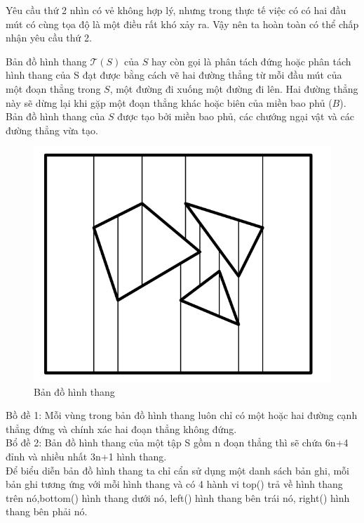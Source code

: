 \documentclass[a4paper,12pt]{report}
\begin{document}
Yêu cầu thứ 2 nhìn có vẻ không hợp lý, nhưng trong thực tế việc có có hai đầu mút có cùng tọa độ là một điều rất khó xảy ra. Vậy nên ta hoàn toàn có thể chấp nhận yêu cầu thứ 2.

Bản đồ hình thang $\mathcal{T}(S)$ của $S$ hay còn gọi là  phân tách đứng hoặc phân tách hình thang của S đạt được bằng cách vẽ hai đường thẳng từ mỗi đầu mút của một đoạn thẳng trong $S$, một đường đi xuống một đường đi lên. Hai đường thẳng này sẽ dừng lại khi gặp một đoạn thẳng khác hoặc biên của miền bao phủ ($B$). Bản đồ hình thang của $S$ được tạo bởi miền bao phủ, các chướng ngại vật và các đường thẳng vừa tạo. \\
\begin{figure}[H]
\label{object_pic}
\centering
\includegraphics[scale=0.4]{trmap.png}
\caption{Bản đồ hình thang}
\end{figure}
Bồ đề 1: Mỗi vùng trong bản đồ hình thang luôn chỉ có một hoặc hai đường cạnh thẳng đứng và chính xác hai đoạn thẳng không đứng.\\

Bổ đề 2: Bản đồ hình thang của một tập S gồm n đoạn thẳng thì sẽ chứa 6n+4 đỉnh và nhiều nhất 3n+1 hình thang.\\

Để biểu diễn bản đồ hình thang ta chỉ cẩn sử dụng một danh sách bản ghi, mỗi bản ghi tương ứng với mỗi hình thang và có 4 hành vi top() trả về hình thang trên nó,bottom() hình thang dưới nó, left() hình thang bên trái nó, right() hình thang bên phải nó. \\
\end{document}
